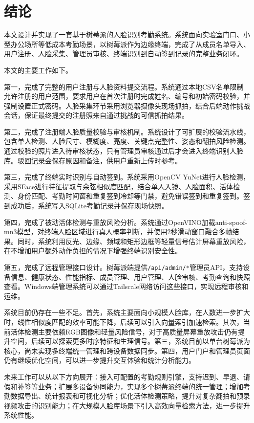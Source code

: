 \chapter*{结\quad 论}

本文设计并实现了一套基于树莓派的人脸识别考勤系统。系统面向实验室门口、小型办公场所等低成本考勤场景，以树莓派作为边缘终端，完成了从成员名单导入、用户注册、人脸采集、管理员审核、终端识别到自动签到记录的完整业务闭环。

本文的主要工作如下。

第一，完成了完整的用户注册与人脸资料提交流程。系统通过本地CSV名单限制允许注册的用户范围，要求用户在首次注册时完成姓名、编号和初始密码校验，并强制设置正式密码。人脸采集环节采用浏览器摄像头现场抓拍，结合后端动作挑战会话，保证最终提交的注册照来自通过挑战的可信抓拍结果。

第二，完成了注册端人脸质量校验与审核机制。系统设计了可扩展的校验流水线，包含单人检测、人脸尺寸、模糊度、亮度、关键点完整性、姿态和翻拍风险检测。通过校验的照片进入待审核状态，只有管理员审核通过后才会进入终端识别人脸库。驳回记录会保存原因和备注，供用户重新上传时参考。

第三，完成了终端实时识别与自动签到。系统采用OpenCV YuNet进行人脸检测，采用SFace进行特征提取与余弦相似度匹配，结合单人入镜、人脸面积、活体检测、身份匹配、考勤时间窗和重复签到冷却等门禁，避免错误签到和重复签到。签到成功后，系统写入SQLite考勤记录并保存现场快照。

第四，完成了被动活体检测与重放风险分析。系统通过OpenVINO加载anti-spoof-mn3模型，对终端人脸区域进行真人概率判断，并使用2秒滑动窗口融合多帧结果。同时，系统利用反光、边缘、频域和矩形边框等轻量信号估计屏幕重放风险，在不增加用户额外动作负担的情况下增强终端识别安全性。

第五，完成了远程管理接口设计。树莓派端提供\texttt{/api/admin/*}管理员API，支持设备信息、健康状态、性能指标、成员管理、用户管理、人脸审核、考勤查询和快照查看。Windows端管理系统可以通过Tailscale网络访问这些接口，实现远程审核和运维。

系统目前仍存在一些不足。首先，系统主要面向小规模人脸库，在人数进一步扩大时，线性相似度匹配的效率可能下降，后续可以引入向量索引加速检索。其次，当前活体检测主要依赖RGB图像和轻量风险信号，对于高质量屏幕重放攻击仍有提升空间，后续可以探索更多时序特征和生理信号。第三，系统目前以单台树莓派为核心，尚未实现多终端统一管理和跨设备数据同步。第四，用户门户和管理员页面仍有继续优化空间，可以进一步提升交互体验和统计分析能力。

未来工作可以从以下方向展开：接入可配置的考勤规则引擎，支持迟到、早退、请假和补签等业务；扩展多设备协同能力，实现多个树莓派终端的统一管理；增加考勤数据导出、统计报表和可视化分析；优化活体检测策略，提升对复杂翻拍和预录视频攻击的识别能力；在大规模人脸库场景下引入高效向量检索方法，进一步提升系统性能。
